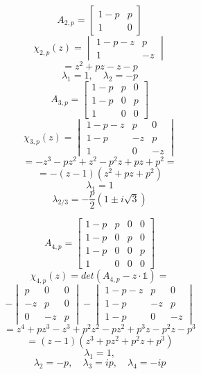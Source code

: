 \begin{flushenum}
  \begin{minipage}{0.4\linewidth}
  \[ A_{2,p} = \begin{bmatrix} 1-p & p \\ 1 & 0 \end{bmatrix} \]
  \[ \chi_{2,p}(z) = \begin{vmatrix} 1-p-z & p \\ 1 & -z \end{vmatrix} \]
  \[ = z^{2} + pz - z - p \]
  \[ \lambda_{1} = 1, \quad \lambda_{2}= -p \]
  \vspace{0.5em}
  \[ A_{3,p} = \begin{bmatrix} 1-p & p & 0 \\
                               1-p & 0 & p \\
                                 1 & 0 & 0 \end{bmatrix} \]
  \[ \chi_{3,p}(z) = \begin{vmatrix} 1-p-z & p  & 0 \\
                                       1-p   & -z & p \\
                                       1     & 0  & -z \end{vmatrix} \]
  \[ = -z^{3} - pz^{2} + z^{2} - p^{2}z + pz + p^{2} = \]
  \[ = -(z - 1) (z^{2} + pz + p^{2}) \]
  \[ \lambda_{1}= 1 \]
  \[ \lambda_{2/3}= -\frac{p}{2}(1 \pm i\sqrt{3}) \]
  \end{minipage}\hfill\begin{minipage}{0.5\linewidth}
  \[ A_{4,p} = \begin{bmatrix} 1-p & p & 0 & 0 \\
                               1-p & 0 & p & 0 \\
                               1-p & 0 & 0 & p \\
                                 1 & 0 & 0 & 0 \end{bmatrix} \]
  \[ \chi_{4,p}(z) = det(A_{4,p} - z\cdot \mathds{1}) = \]
  \[                 -\begin{vmatrix} p & 0 & 0 \\
                                     -z & p & 0 \\
                                      0 &-z & p \end{vmatrix} 
                     -\begin{vmatrix} 1-p-z & p & 0 \\
                                      1-p & -z & p \\
                                      1-p & 0 & -z \end{vmatrix} \]
  \[ = z^4 + pz^3 - z^3 + p^{2}z^2 - pz^2 + p^{3}z - p^{2}z -p^3 \]
  \[ = (z - 1) (z^{3} + pz^{2} + p^{2}z + p^{3}) \]
  \[ \lambda_{1}= 1, \]
  \[ \lambda_{2}= -p, \quad
     \lambda_{3}= ip, \quad
     \lambda_{4}= -ip\]
  \end{minipage}
  

\end{flushenum}
